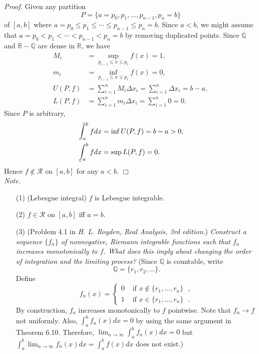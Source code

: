 \documentclass{article}
\def\upint{\mathchoice%
    {\mkern13mu\overline{\vphantom{\intop}\mkern7mu}\mkern-20mu}%
    {\mkern7mu\overline{\vphantom{\intop}\mkern7mu}\mkern-14mu}%
    {\mkern7mu\overline{\vphantom{\intop}\mkern7mu}\mkern-14mu}%
    {\mkern7mu\overline{\vphantom{\intop}\mkern7mu}\mkern-14mu}%
  \int}
\def\lowint{\mkern3mu\underline{\vphantom{\intop}\mkern7mu}\mkern-10mu\int}
\begin{document}
\emph{Proof.}
Given any partition
\[
  P = \{a = p_0, p_1, \ldots, p_{n-1}, p_n = b \}
\]
of $[a,b]$ where $a = p_0 \leq p_1 \leq \cdots \leq p_{n-1} \leq p_n = b$.
Since $a < b$, we might assume that $a = p_0 < p_1 < \cdots < p_{n-1} < p_n = b$
by removing duplicated points.
Since $\mathbb{Q}$ and $\mathbb{R} - \mathbb{Q}$ are dense in $\mathbb{R}$, we have
\begin{align*}
  M_i &= \sup_{p_{i-1} \leq x \leq p_i} f(x) = 1, \\
  m_i &= \inf_{p_{i-1} \leq x \leq p_i} f(x) = 0, \\
  U(P,f) &= \sum_{i=1}^{n} M_i \Delta x_i = \sum_{i=1}^{n} \Delta x_i = b - a, \\
  L(P,f) &= \sum_{i=1}^{n} m_i \Delta x_i = \sum_{i=1}^{n} 0 = 0.
\end{align*}
Since $P$ is arbitrary,
\begin{align*}
  \upint_a^b f dx &= \inf U(P,f) = b-a > 0, \\
  \lowint_a^b f dx &= \sup L(P,f) = 0.
\end{align*}
Hence $f \not\in \mathscr{R}$ on $[a,b]$ for any $a < b$.
$\Box$ \\

\emph{Note.}
\begin{enumerate}
\item[(1)]
  (Lebesgue integral)
  $f$ is Lebesgue integrable.

\item[(2)]
  $f \in \mathscr{R}$ on $[a,b]$ iff $a = b$.

\item[(3)]
  (Problem 4.1 in \emph{H. L. Royden, Real Analysis, 3rd edition}.)
  \emph{Construct a sequence $\{f_n\}$ of nonnegative,
  Riemann integrable functions such that $f_n$ increases monotonically to $f$.
  What does this imply about changing the order of integration and the limiting process?}
  (Since $\mathbb{Q}$ is countable, write
  \[
    \mathbb{Q} = \{ r_1, r_2, \ldots \}.
  \]
  Define
  \begin{equation*}
    f_n(x) =
      \begin{cases}
        0 & \text{ if $x \not\in \{ r_1, \ldots, r_n \}$ }, \\
        1 & \text{ if $x \in \{ r_1, \ldots, r_n \}$ }.
      \end{cases}
  \end{equation*}
  By construction, $f_n$ increases monotonically to $f$ pointwise.
  Note that $f_n \to f$ not uniformly.
  Also, $\int_{a}^{b} f_n(x) dx = 0$ by using the same argument in Theorem 6.10.
  Therefore,
  $\lim_{n \to \infty} \int_{a}^{b} f_n(x) dx = 0$
  but $\int_{a}^{b} \lim_{n \to \infty} f_n(x) dx = \int_{a}^{b} f(x) dx$
  does not exist.) \\\\
\end{enumerate}
\end{document}
